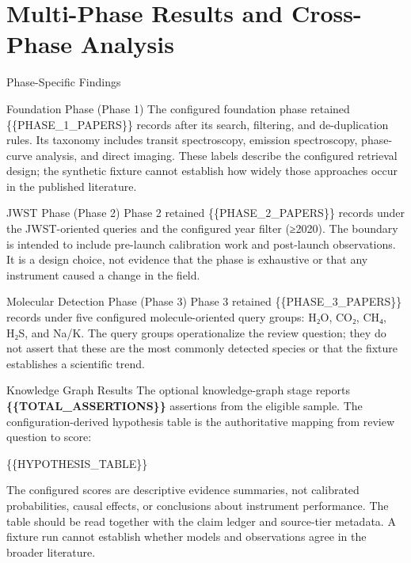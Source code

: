 \documentclass[
  ignorenonframetext,
]{beamer}
\author{}
\date{}
\begin{document}
\section{Multi-Phase Results and Cross-Phase
Analysis}\label{multi-phase-results-and-cross-phase-analysis}

\begin{frame}[allowframebreaks]{Phase-Specific Findings}
\label{phase-specific-findings}
\begin{block}{Foundation Phase (Phase 1)}
\label{foundation-phase-phase-1}
The configured foundation phase retained \{\{PHASE\_1\_PAPERS\}\}
records after its search, filtering, and de-duplication rules. Its
taxonomy includes transit spectroscopy, emission spectroscopy,
phase-curve analysis, and direct imaging. These labels describe the
configured retrieval design; the synthetic fixture cannot establish how
widely those approaches occur in the published literature.
\end{block}

\begin{block}{JWST Phase (Phase 2)}
\label{jwst-phase-phase-2}
Phase 2 retained \{\{PHASE\_2\_PAPERS\}\} records under the
JWST-oriented queries and the configured year filter (≥2020). The
boundary is intended to include pre-launch calibration work and
post-launch observations. It is a design choice, not evidence that the
phase is exhaustive or that any instrument caused a change in the field.
\end{block}

\begin{block}{Molecular Detection Phase (Phase 3)}
\label{molecular-detection-phase-phase-3}
Phase 3 retained \{\{PHASE\_3\_PAPERS\}\} records under five configured
molecule-oriented query groups: H₂O, CO₂, CH₄, H₂S, and Na/K. The query
groups operationalize the review question; they do not assert that these
are the most commonly detected species or that the fixture establishes a
scientific trend.
\end{block}
\end{frame}

\begin{frame}[allowframebreaks]{Knowledge Graph Results}
\label{knowledge-graph-results}
The optional knowledge-graph stage reports
\textbf{\{\{TOTAL\_ASSERTIONS\}\}} assertions from the eligible sample.
The configuration-derived hypothesis table is the authoritative mapping
from review question to score:

\{\{HYPOTHESIS\_TABLE\}\}

The configured scores are descriptive evidence summaries, not calibrated
probabilities, causal effects, or conclusions about instrument
performance. The table should be read together with the claim ledger and
source-tier metadata. A fixture run cannot establish whether models and
observations agree in the broader literature.
\end{frame}
\end{document}

